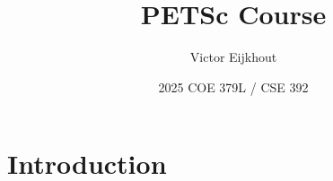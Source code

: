 \documentclass[11pt]{beamer}
\author[Eijkhout]{Victor Eijkhout}
\date[2025]{2025 COE 379L / CSE 392}
\title[PETSc]{PETSc Course}
\begin{document}
\frame{\titlepage}

\section{Introduction}


\begin{standalone}

\end{standalone}












\end{document}

